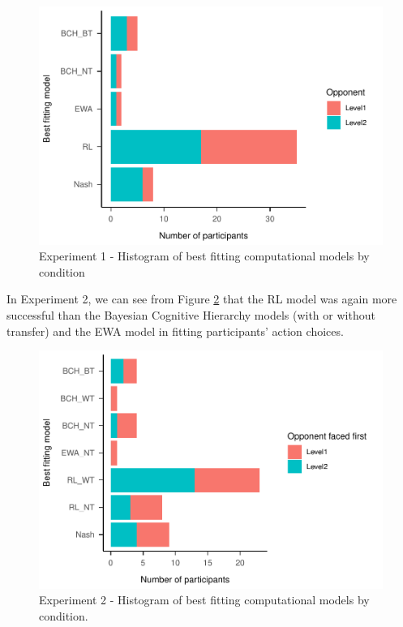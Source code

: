 \documentclass[smallextended]{svjour3}       %
\begin{document}
\begin{figure}

{\centering \includegraphics[width=\textwidth]{CBB_v2_files/figure-latex/exp1-comp-models-1} 

}

\caption{Experiment 1 - Histogram of best fitting computational models by condition}\label{fig:exp1-comp-models}
\end{figure}

In Experiment 2, we can see from Figure \ref{fig:exp2-comp-models} that
the RL model was again more successful than the Bayesian Cognitive
Hierarchy models (with or without transfer) and the EWA model in fitting
participants' action choices.

\begin{figure}

{\centering \includegraphics[width=\textwidth]{CBB_v2_files/figure-latex/exp2-comp-models-1} 

}

\caption{Experiment 2 - Histogram of best fitting computational models by condition.}\label{fig:exp2-comp-models}
\end{figure}
\end{document}
